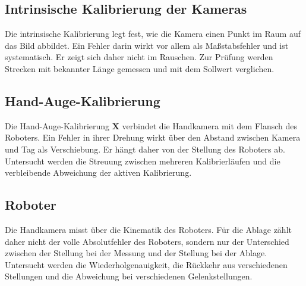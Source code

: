 
\subsection{Intrinsische Kalibrierung der Kameras}
\label{subsec:Intrinsik}

Die intrinsische Kalibrierung legt fest, wie die Kamera einen Punkt im Raum auf das Bild abbildet. Ein Fehler darin wirkt vor allem als Maßstabsfehler und ist systematisch. Er zeigt sich daher nicht im Rauschen. Zur Prüfung werden Strecken mit bekannter Länge gemessen und mit dem Sollwert verglichen.


\subsection{Hand-Auge-Kalibrierung}
\label{subsec:HandAuge}

Die Hand-Auge-Kalibrierung $\mathbf{X}$ verbindet die Handkamera mit dem Flansch des Roboters. Ein Fehler in ihrer Drehung wirkt über den Abstand zwischen Kamera und Tag als Verschiebung. Er hängt daher von der Stellung des Roboters ab. Untersucht werden die Streuung zwischen mehreren Kalibrierläufen und die verbleibende Abweichung der aktiven Kalibrierung.


\subsection{Roboter}
\label{subsec:Roboter_Genauigkeit}

Die Handkamera misst über die Kinematik des Roboters. Für die Ablage zählt daher nicht der volle Absolutfehler des Roboters, sondern nur der Unterschied zwischen der Stellung bei der Messung und der Stellung bei der Ablage. Untersucht werden die Wiederholgenauigkeit, die Rückkehr aus verschiedenen Stellungen und die Abweichung bei verschiedenen Gelenkstellungen.

